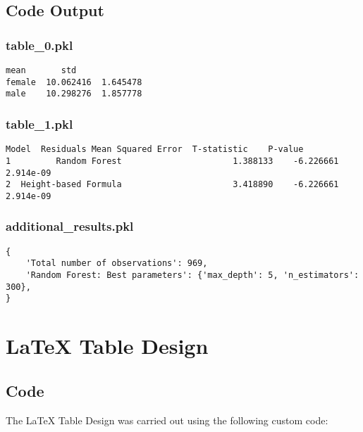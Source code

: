 \documentclass[11pt]{article}
\begin{document}
\subsection{Code Output}

\subsubsection*{table\_0.pkl}

\begin{Verbatim}[tabsize=4]
             mean       std
female  10.062416  1.645478
male    10.298276  1.857778
\end{Verbatim}

\subsubsection*{table\_1.pkl}

\begin{Verbatim}[tabsize=4]
                  Model  Residuals Mean Squared Error  T-statistic    P-value
1         Random Forest                      1.388133    -6.226661  2.914e-09
2  Height-based Formula                      3.418890    -6.226661  2.914e-09
\end{Verbatim}

\subsubsection*{additional\_results.pkl}

\begin{Verbatim}[tabsize=4]
{
    'Total number of observations': 969,
    'Random Forest: Best parameters': {'max_depth': 5, 'n_estimators': 300},
}
\end{Verbatim}

\section{LaTeX Table Design}
\subsection{{Code}}
The LaTeX Table Design was carried out using the following custom code:
\end{document}
